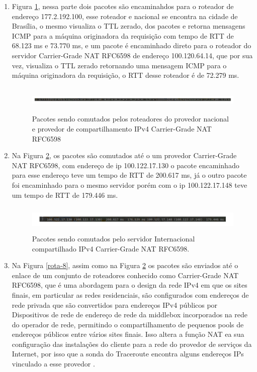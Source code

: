 \documentclass[
	article,			%
	11pt,				%
	oneside,			%
	a4paper,			%
	english,			%
	brazil,				%
	sumario=tradicional
	]{abntex2}
\begin{document}
\begin{enumerate}
		\item 
		Figura \ref{rota-6}, nessa parte dois pacotes são encaminahdos para o roteador de endereço 177.2.192.100, esse roteador e nacional se encontra na cidade de  Brasília, o mesmo visualiza o TTL zerado, dos pacotes e retorna mensagens ICMP para a máquina originadora da requisição com tempo de RTT de 68.123 ms e 73.770 ms, e um pacote é encaminhado direto para o roteador do servidor Carrier-Grade NAT RFC6598 de endereço 100.120.64.14, que por sua vez, visualiza o TTL zerado retornando uma mensagem ICMP para o máquina originadora da requisição, o RTT desse roteador é de 72.279 ms.
	
	\begin{figure}[H]
		\centering
		\includegraphics[width=17cm,height=1.3cm]{./rota-6.png}
		\caption{Pacotes sendo comutados pelos roteadores do provedor nacional e provedor de compartilhamento IPv4 Carrier-Grade NAT RFC6598 }
		\label{rota-6}
	\end{figure}

		\item Na Figura \ref{rota-7}, os pacotes são comutados até o um provedor Carrier-Grade NAT RFC6598, com endereço de ip 100.122.17.130 o pacote encaminhado para esse endereço teve um tempo de RTT de 200.617 ms, já o outro pacote foi encaminhado para o mesmo servidor porém com o ip  100.122.17.148 teve um tempo de RTT de 179.446 ms.  
	
	\begin{figure}[H]
		\centering
		\includegraphics[width=17cm,height=1.3cm]{./rota-7.png}
		\caption{Pacotes sendo comutados pelo servidor Internacional compartilhado IPv4 Carrier-Grade NAT RFC6598.}
		\label{rota-7}
	\end{figure}
	 	
	 	\item Na Figura \ref{rota-8}, assim como na Figura \ref{rota-7} os pacotes são enviados até o enlace de um conjunto de roteadores conhecido como Carrier-Grade NAT RFC6598, que é uma abordagem para o design da rede IPv4 em que os sites finais, em particular as redes residenciais, são configurados com endereços de rede privada que são convertidos para endereços IPv4 públicos por Dispositivos de rede de endereço de rede da middlebox incorporados na rede do operador de rede, permitindo o compartilhamento de pequenos pools de endereços públicos entre vários sites finais. Isso altera a função NAT ea sua configuração das instalações do cliente para a rede do provedor de serviços da Internet, por isso que a sonda do Traceroute encontra alguns endereços IPs vinculado a esse provedor \cite{rfcc}.
	 	

\end{enumerate}
\end{document}
